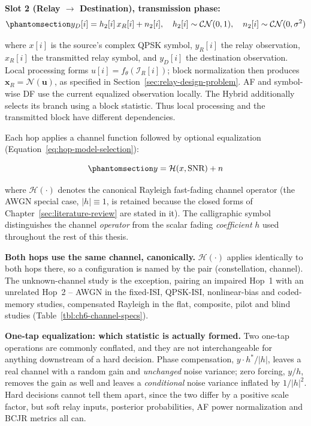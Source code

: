 \textbf{Slot 2 (Relay $\to$ Destination), transmission phase:} \begin{equation}\protect\phantomsection\label{eq:rayleigh-hop2}{y_D[i] = h_2[i]\,x_R[i] + n_2[i], \quad h_2[i] \sim \mathcal{CN}(0, 1), \quad n_2[i] \sim \mathcal{CN}(0, \sigma^2)
}\end{equation}

where \(x[i]\) is the source's complex QPSK symbol, \(y_R[i]\) the relay observation, \(x_R[i]\) the transmitted relay symbol, and \(y_D[i]\) the destination observation. Local processing forms $u[i]=f_\theta(\mathcal I_R[i])$; block normalization then produces $\mathbf x_R=\mathcal N(\mathbf u)$, as specified in Section~\ref{sec:relay-design-problem}. AF and symbol-wise DF use the current equalized observation locally. The Hybrid additionally selects its branch using a block statistic. Thus local processing and the transmitted block have different dependencies.

Each hop applies a channel function followed by optional equalization (Equation~\ref{eq:hop-model-selection}):

\begin{equation}\protect\phantomsection\label{eq:hop-model-selection}{y = \mathcal{H}(x, \text{SNR}) + n}
\end{equation}

where \(\mathcal{H}(\cdot)\) denotes the canonical Rayleigh fast-fading channel operator (the AWGN special case, $|h|\equiv1$, is retained because the closed forms of Chapter~\ref{sec:literature-review} are stated in it). The calligraphic symbol distinguishes the channel \emph{operator} from the scalar fading \emph{coefficient} \(h\) used throughout the rest of this thesis.

\textbf{Both hops use the same channel, canonically.} \(\mathcal{H}(\cdot)\) applies identically to both hops there, so a configuration is named by the pair (constellation, channel). The unknown-channel study is the exception, pairing an impaired Hop~1 with an unrelated Hop~2 -- AWGN in the fixed-ISI, QPSK-ISI, nonlinear-bias and coded-memory studies, compensated Rayleigh in the flat, composite, pilot and blind studies (Table~\ref{tbl:ch6-channel-specs}).

\textbf{One-tap equalization: which statistic is actually formed.} Two one-tap operations are commonly conflated, and they are not interchangeable for anything downstream of a hard decision. Phase compensation, $y \cdot h^{*}/|h|$, leaves a real channel with a random gain and \emph{unchanged} noise variance; zero forcing, $y/h$, removes the gain as well and leaves a \emph{conditional} noise variance inflated by $1/|h|^{2}$. Hard decisions cannot tell them apart, since the two differ by a positive scale factor, but soft relay inputs, posterior probabilities, AF power normalization and BCJR metrics all can.

